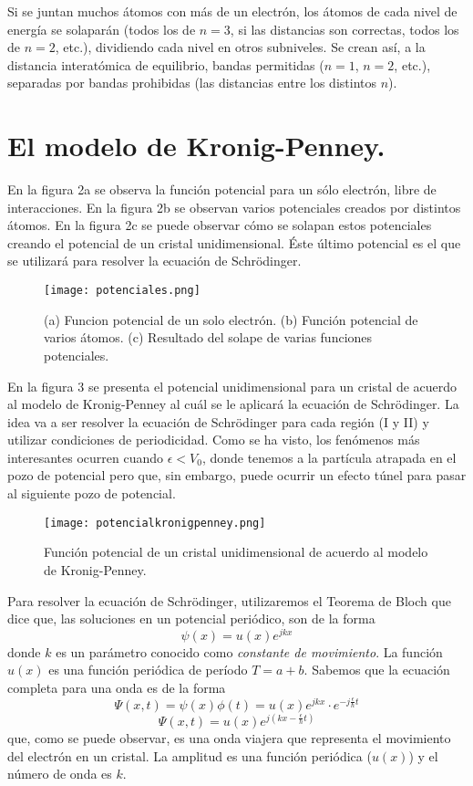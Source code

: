 \documentclass[12pt,a4paper]{article}
\begin{document}
Si se juntan muchos átomos con más de un electrón, los átomos de cada nivel de energía se solaparán (todos los de $n=3$, si las distancias son correctas, todos los de $n=2$, etc.), dividiendo cada nivel en otros subniveles. Se crean así, a la distancia interatómica de equilibrio, bandas permitidas ($n=1$, $n=2$, etc.), separadas por bandas prohibidas (las distancias entre los distintos $n$).

\section{El modelo de Kronig-Penney.}

En la figura 2a se observa la función potencial para un sólo electrón, libre de interacciones. En la figura 2b se observan varios potenciales creados por distintos átomos. En la figura 2c se puede observar cómo se solapan estos potenciales creando el potencial de un cristal unidimensional. Éste último potencial es el que se utilizará para resolver la ecuación de Schrödinger.

\begin{figure}[ht!]
\begin{center}
\texttt{[image: potenciales.png]}
\caption{(a) Funcion potencial de un solo electrón. (b) Función potencial de varios átomos. (c) Resultado del solape de varias funciones potenciales.}
\end{center}
\end{figure}

En la figura 3 se presenta el potencial unidimensional para un cristal de acuerdo al modelo de Kronig-Penney al cuál se le aplicará la ecuación de Schrödinger. La idea va a ser resolver la ecuación de Schrödinger para cada región (I y II) y utilizar condiciones de periodicidad. Como se ha visto, los fenómenos más interesantes ocurren cuando $\epsilon<V_{0}$, donde tenemos a la partícula atrapada en el pozo de potencial pero que, sin embargo, puede ocurrir un efecto túnel para pasar al siguiente pozo de potencial.

\begin{figure}[ht!]
\begin{center}
\texttt{[image: potencialkronigpenney.png]}
\caption{Función potencial de un cristal unidimensional de acuerdo al modelo de Kronig-Penney.}
\end{center}
\end{figure}

Para resolver la ecuación de Schrödinger, utilizaremos el Teorema de Bloch que dice que, las soluciones en un potencial periódico, son de la forma
\[ \psi (x) = u(x) e^{jkx} \]
donde $k$ es un parámetro conocido como \emph{constante de movimiento}. La función $u(x)$ es una función periódica de período $T=a+b$. Sabemos que la ecuación completa para una onda es de la forma
\[ \Psi (x,t)= \psi(x) \phi(t) = u(x) e^{jkx} \cdot e^{-j \frac{\epsilon}{\hbar} t} \]
\[ \Psi (x,t)= u(x) e^{j(kx - \frac{\epsilon}{\hbar}t)} \]
que, como se puede observar, es una onda viajera que representa el movimiento del electrón en un cristal. La amplitud es una función periódica ($u(x)$) y el número de onda es $k$.
\end{document}
